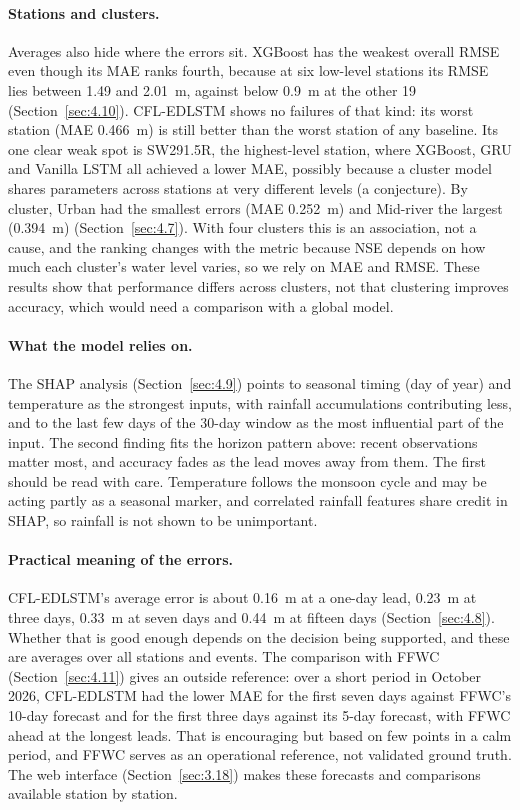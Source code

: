 \paragraph{Stations and clusters.}
Averages also hide where the errors sit. XGBoost has the weakest overall RMSE
even though its MAE ranks fourth, because at six low-level stations its RMSE lies
between 1.49 and 2.01~m, against below 0.9~m at the other 19
(Section~\ref{sec:4.10}). CFL-EDLSTM shows no failures of that kind: its worst
station (MAE 0.466~m) is still better than the worst station of any baseline.
Its one clear weak spot is SW291.5R, the highest-level station, where XGBoost,
GRU and Vanilla LSTM all achieved a lower MAE, possibly because a cluster model
shares parameters across stations at very different levels (a conjecture). By
cluster, Urban had the smallest errors (MAE 0.252~m) and Mid-river the largest
(0.394~m) (Section~\ref{sec:4.7}). With four clusters this is an association,
not a cause, and the ranking changes with the metric because NSE depends on how
much each cluster's water level varies, so we rely on MAE and RMSE. These results
show that performance differs across clusters, not that clustering improves
accuracy, which would need a comparison with a global model.

\paragraph{What the model relies on.}
The SHAP analysis (Section~\ref{sec:4.9}) points to seasonal timing (day of year)
and temperature as the strongest inputs, with rainfall accumulations contributing
less, and to the last few days of the 30-day window as the most influential part
of the input. The second finding fits the horizon pattern above: recent
observations matter most, and accuracy fades as the lead moves away from them.
The first should be read with care. Temperature follows the monsoon cycle and
may be acting partly as a seasonal marker, and correlated rainfall features share
credit in SHAP, so rainfall is not shown to be unimportant.

\paragraph{Practical meaning of the errors.}
CFL-EDLSTM's average error is about 0.16~m at a one-day lead, 0.23~m at three
days, 0.33~m at seven days and 0.44~m at fifteen days (Section~\ref{sec:4.8}).
Whether that is good enough depends on the decision being supported, and these
are averages over all stations and events. The comparison with FFWC
(Section~\ref{sec:4.11}) gives an outside reference: over a short period in
October 2026, CFL-EDLSTM had the lower MAE for the first seven days against
FFWC's 10-day forecast and for the first three days against its 5-day forecast,
with FFWC ahead at the longest leads. That is encouraging but based on few points
in a calm period, and FFWC serves as an operational reference, not validated
ground truth. The web interface (Section~\ref{sec:3.18}) makes these forecasts
and comparisons available station by station.

